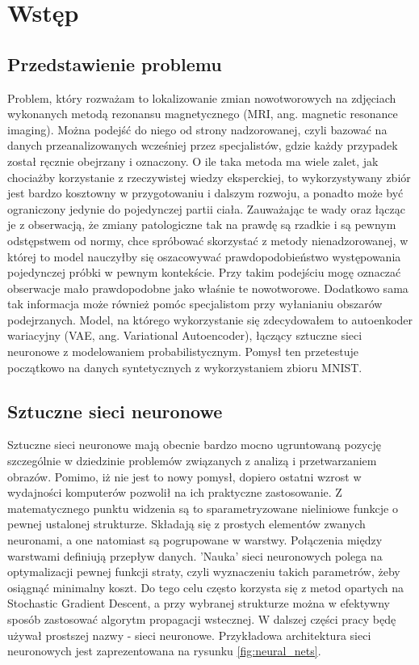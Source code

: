 \chapter{Wstęp}

\section{Przedstawienie problemu}

Problem, który rozważam to lokalizowanie zmian nowotworowych na zdjęciach wykonanych metodą rezonansu magnetycznego (MRI, ang. magnetic resonance imaging). Można podejść do niego od strony nadzorowanej, czyli bazować na danych przeanalizowanych wcześniej przez specjalistów, gdzie każdy przypadek został ręcznie obejrzany i oznaczony. O ile taka metoda ma wiele zalet, jak chociażby korzystanie z rzeczywistej wiedzy eksperckiej, to wykorzystywany zbiór jest bardzo kosztowny w przygotowaniu i dalszym rozwoju, a ponadto może być ograniczony jedynie do pojedynczej partii ciała. Zauważając te wady oraz łącząc je z obserwacją, że zmiany patologiczne tak na prawdę są rzadkie i są pewnym odstępstwem od normy, chce spróbować skorzystać z metody nienadzorowanej, w której to model nauczyłby się oszacowywać prawdopodobieństwo występowania pojedynczej próbki w pewnym kontekście. Przy takim podejściu mogę oznaczać obserwacje mało prawdopodobne jako właśnie te nowotworowe. Dodatkowo sama tak informacja może również pomóc specjalistom przy wyłanianiu obszarów podejrzanych. Model, na którego wykorzystanie się zdecydowałem to autoenkoder wariacyjny (VAE, ang. Variational Autoencoder), łączący sztuczne sieci neuronowe z modelowaniem probabilistycznym. Pomysł ten przetestuje początkowo na danych syntetycznych z wykorzystaniem zbioru MNIST.

\section{Sztuczne sieci neuronowe}

Sztuczne sieci neuronowe mają obecnie bardzo mocno ugruntowaną pozycję szczególnie w dziedzinie problemów związanych z analizą i przetwarzaniem obrazów. Pomimo, iż nie jest to nowy pomysł, dopiero ostatni wzrost w wydajności komputerów pozwolił na ich praktyczne zastosowanie. Z matematycznego punktu widzenia są to sparametryzowane nieliniowe funkcje o pewnej ustalonej strukturze. Składają się z prostych elementów zwanych neuronami, a one natomiast są pogrupowane w warstwy. Połączenia między warstwami definiują przepływ danych. 'Nauka' sieci neuronowych polega na optymalizacji pewnej funkcji straty, czyli wyznaczeniu takich parametrów, żeby osiągnąć minimalny koszt. Do tego celu często korzysta się z metod opartych na Stochastic Gradient Descent, a przy wybranej strukturze można w efektywny sposób zastosować algorytm propagacji wstecznej. W dalszej części pracy będę używał prostszej nazwy - sieci neuronowe. Przykładowa architektura sieci neuronowych jest zaprezentowana na rysunku \ref{fig:neural_nets}.

